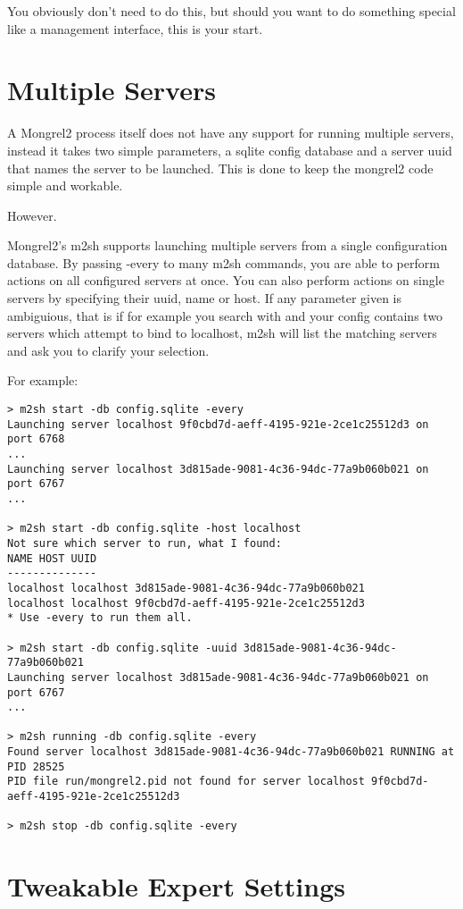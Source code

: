 You obviously don't need to do this, but should you want to do
something special like a management interface, this is your start.


\section{Multiple Servers}

A Mongrel2 process itself does not have any support for running multiple servers,
instead it takes two simple parameters, a sqlite config database and a server uuid
that names the server to be launched. This is done to keep the mongrel2 code simple
and workable.

However.

Mongrel2's m2sh supports launching multiple servers from a single configuration
database. By passing -every to many m2sh commands, you are able to perform actions
on all configured servers at once. You can also perform actions on single servers
by specifying their uuid, name or host. If any parameter given is ambiguious, that
is if for example you search with  and your config contains
two servers which attempt to bind to localhost, m2sh will list the matching servers
and ask you to clarify your selection.

For example:
\begin{Verbatim}
> m2sh start -db config.sqlite -every
Launching server localhost 9f0cbd7d-aeff-4195-921e-2ce1c25512d3 on port 6768
...
Launching server localhost 3d815ade-9081-4c36-94dc-77a9b060b021 on port 6767
...

> m2sh start -db config.sqlite -host localhost
Not sure which server to run, what I found:
NAME HOST UUID
--------------
localhost localhost 3d815ade-9081-4c36-94dc-77a9b060b021
localhost localhost 9f0cbd7d-aeff-4195-921e-2ce1c25512d3
* Use -every to run them all.

> m2sh start -db config.sqlite -uuid 3d815ade-9081-4c36-94dc-77a9b060b021
Launching server localhost 3d815ade-9081-4c36-94dc-77a9b060b021 on port 6767
...

> m2sh running -db config.sqlite -every
Found server localhost 3d815ade-9081-4c36-94dc-77a9b060b021 RUNNING at PID 28525
PID file run/mongrel2.pid not found for server localhost 9f0cbd7d-aeff-4195-921e-2ce1c25512d3

> m2sh stop -db config.sqlite -every
\end{Verbatim}

\section{Tweakable Expert Settings}


